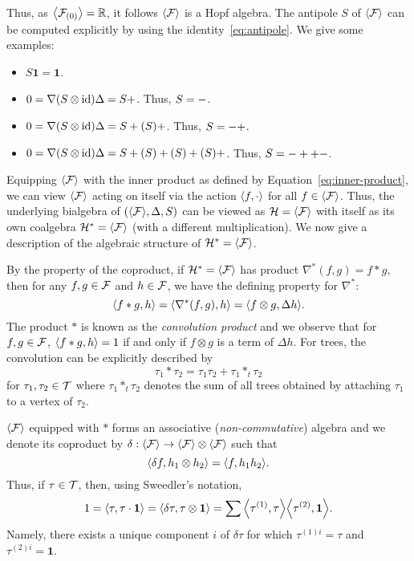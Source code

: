 \documentclass[11pt]{style/preprint}
\begin{document}
Thus, as \(\< \CF_{(0)}\> = \mathbb{R}\), it follows \(\< \CF\>\) is a Hopf algebra.
The antipole \(S\) of \(\< \CF\>\) can be computed explicitly by using the identity~\eqref{eq:antipole}. 
We give some examples:
\begin{itemize}
  \item \(S \mathbf{1} = \mathbf{1}\).
  \item \(0 = \nabla (S \otimes \text{id}) \Delta \tree<X> = S \tree<X> + \tree<X>\). Thus, \(S \tree<X> = -\tree<X>\).
  \item \(0 = \nabla (S \otimes \text{id}) \Delta \tree<1> = S \tree<1> + (S \tree<Xb>) \tree<X> + \tree<1>\). 
    Thus, \(S \tree<1> = -\tree<1> + \tree<X> \tree<Xb>\).
  \item \(0 = \nabla (S \otimes \text{id}) \Delta \tree<2> = S \tree<2> + (S \tree<Xb> \tree<Xc>) \tree<X> + (S \tree<Xc>) \tree<1> + (S \tree<Xb>) \tree<1ac> + \tree<2>\).
    Thus, \(S \tree<2> = -\tree<2> + \tree<Xc> \tree<1> + \tree<Xb> \tree<1ac> - \tree<X> \tree<Xb> \tree<Xc>\).
\end{itemize}

Equipping \(\< \CF \>\) with the inner product as defined by Equation~\eqref{eq:inner-product}, 
we can view \(\< \CF \>\) acting on itself via the action \(\< f, \cdot \>\) 
for all \(f \in \< \CF \>\). Thus, the underlying bialgebra of \((\< \CF \>, \Delta, S)\) 
can be viewed as \(\CH = \< \CF \>\) with itself as its own coalgebra \(\CH^* = \< \CF \>\) 
(with a different multiplication). We now give a description of the algebraic structure of 
\(\CH^* = \< \CF \>\).

By the property of the coproduct, if \(\CH^* = \< \CF \>\) has product \(\nabla^*(f, g) = f * g\), then
for any \(f, g \in {\mathcal F}\) and \(h \in {\mathcal F}\), we have the defining property for \(\nabla^*\):
\[\< f * g, h\> = \< \nabla^*(f, g), h\> = \< f \otimes g, \Delta h\>.\]
The product \(*\) is known as the \textit{convolution product} and we observe that for \(f, g \in {\mathcal F}\), 
\(\< f * g, h\> = 1\) if and only if \(f \otimes g\) is a term of \(\Delta h\). For trees, the 
convolution can be explicitly described by
\[\tau_1 * \tau_2 = \tau_1 \tau_2 + \tau_1 *_t \tau_2\]
for \(\tau_1, \tau_2 \in {\mathcal T}\) where \(\tau_1 *_t \tau_2\) denotes the sum of all trees obtained 
by attaching \(\tau_1\) to a vertex of \(\tau_2\).

\(\< \CF \>\) equipped with \(*\) forms an associative (\textit{non-commutative}) algebra 
and we denote its coproduct by \(\delta :  \< \CF \> \to  \< \CF \> \otimes  \< \CF \>\) 
such that 
\[\< \delta f, h_1 \otimes h_2\> = \< f, h_1 h_2\>.\]
Thus, if \(\tau \in {\mathcal T}\), then, using Sweedler's notation,
\[1 = \< \tau, \tau \cdot \mathbf{1}\> = \< \delta \tau, \tau \otimes \mathbf{1}\>
  = \sum \< \tau^{(1)}, \tau\> \< \tau^{(2)}, \mathbf{1}\>.\]
Namely, there exists a unique component \(i\) of \(\delta \tau\) for which \(\tau^{(1)i} = \tau\) and 
\(\tau^{(2)i} = \mathbf{1}\).
\end{document}
